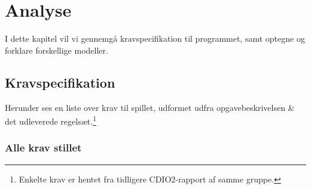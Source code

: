 \chapter{Analyse}

I dette kapitel vil vi gennemgå kravspecifikation til programmet, samt optegne og forklare forskellige modeller.


\section{Kravspecifikation}

Herunder ses en liste over krav til spillet, udformet udfra opgavebeskrivelsen \& det udleverede regelsæt.\footnote{Enkelte krav er hentet fra tidligere CDIO2-rapport af samme gruppe.}

\subsection{Alle krav stillet}

